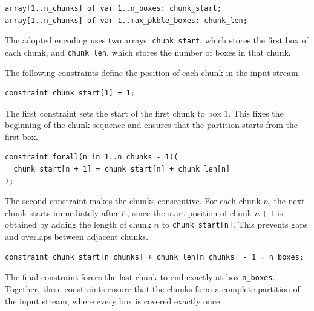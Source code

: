 \vspace{0.5cm}
\begin{lstlisting}
array[1..n_chunks] of var 1..n_boxes: chunk_start;
array[1..n_chunks] of var 1..max_pkble_boxes: chunk_len;
\end{lstlisting}
\vspace{0.5cm}
The adopted encoding uses two arrays: \texttt{chunk\_start}, which stores
the first box of each chunk, and \texttt{chunk\_len}, which stores the
number of boxes in that chunk.

The following constraints define the position of each chunk in the input
stream:

\begin{lstlisting}
constraint chunk_start[1] = 1;
\end{lstlisting}

The first constraint sets the start of the first chunk to box \(1\). This fixes
the beginning of the chunk sequence and ensures that the partition starts from
the first box.

\begin{lstlisting}
constraint forall(n in 1..n_chunks - 1)(
  chunk_start[n + 1] = chunk_start[n] + chunk_len[n]
);
\end{lstlisting}

The second constraint makes the chunks consecutive. For each chunk \(n\), the
next chunk starts immediately after it, since the start position of chunk
\(n+1\) is obtained by adding the length of chunk \(n\) to
\texttt{chunk\_start[n]}. This prevents gaps and overlaps between adjacent
chunks.

\begin{lstlisting}
constraint chunk_start[n_chunks] + chunk_len[n_chunks] - 1 = n_boxes;
\end{lstlisting}

The final constraint forces the last chunk to end exactly at box
\texttt{n\_boxes}. Together, these constraints ensure that the chunks form a
complete partition of the input stream, where every box is covered exactly once.